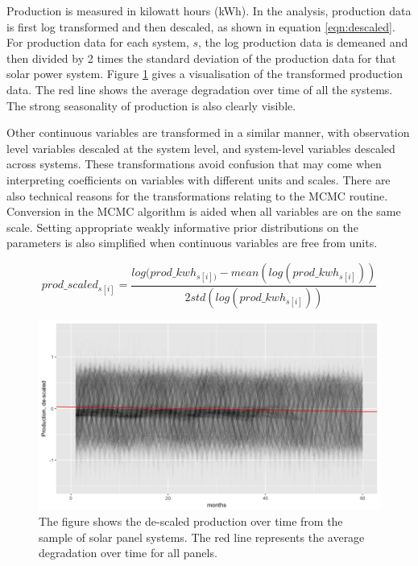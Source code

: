 \documentclass[12pt]{article}
\begin{document}
Production is measured in kilowatt hours (kWh). In the analysis, production data is first log transformed and then descaled, as shown in equation \ref{eqn:descaled}. For production data for each system, $s$, the log production data is demeaned and then divided by 2 times the standard deviation of the production data for that solar power system. Figure \ref{fig:production} gives a visualisation of the transformed production data. The red line shows the average degradation over time of all the systems. The strong seasonality of production is also clearly visible.

Other continuous variables are transformed in a similar manner, with observation level variables descaled at the system level, and system-level variables descaled across systems. These transformations avoid confusion that may come when interpreting coefficients on variables with different units and scales. There are also technical reasons for the transformations relating to the MCMC routine. Conversion in the MCMC algorithm is aided when all variables are on the same scale. Setting appropriate weakly informative prior distributions on the parameters is also simplified when continuous variables are free from units.

\begin{equation}
prod\_scaled_{s[i]} = \frac{log(prod\_kwh_{s[i])} - mean(log(prod\_kwh_{s[i]}))}{2 std(log(prod\_kwh_{s[i]}))}
\label{eqn:descaled}
\end{equation}

\begin{figure}
  \includegraphics[width=1\linewidth]{figures/production.png}
  \caption{The figure shows the de-scaled production over time from the sample of solar panel systems. The red line represents the average degradation over time for all panels.}
  \label{fig:production}
\end{figure}
\end{document}
